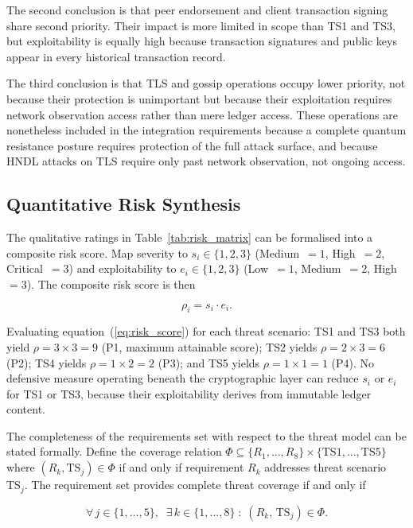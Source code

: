 \documentclass[conference]{IEEEtran}
\begin{document}
The second conclusion is that peer endorsement and client transaction
signing share second priority. Their impact is more limited in scope than
TS1 and TS3, but exploitability is equally high because transaction
signatures and public keys appear in every historical transaction record.

The third conclusion is that TLS and gossip operations occupy lower
priority, not because their protection is unimportant but because their
exploitation requires network observation access rather than mere ledger
access. These operations are nonetheless included in the integration
requirements because a complete quantum resistance posture requires
protection of the full attack surface, and because HNDL attacks on TLS
require only past network observation, not ongoing access.

\subsection{Quantitative Risk Synthesis}
\label{sec:tm_risk_quant}

The qualitative ratings in Table~\ref{tab:risk_matrix} can be
formalised into a composite risk score. Map severity to
$s_i \in \{1, 2, 3\}$ (Medium~$= 1$, High~$= 2$, Critical~$= 3$)
and exploitability to $e_i \in \{1, 2, 3\}$ (Low~$= 1$,
Medium~$= 2$, High~$= 3$). The composite risk score is then

\begin{equation}
\rho_i = s_i \cdot e_i.
\label{eq:risk_score}
\end{equation}

Evaluating equation~(\ref{eq:risk_score}) for each threat scenario:
TS1 and TS3 both yield $\rho = 3 \times 3 = 9$ (P1, maximum
attainable score); TS2 yields $\rho = 2 \times 3 = 6$ (P2);
TS4 yields $\rho = 1 \times 2 = 2$ (P3); and TS5 yields
$\rho = 1 \times 1 = 1$ (P4). No defensive measure operating
beneath the cryptographic layer can reduce $s_i$ or $e_i$
for TS1 or TS3, because their exploitability derives from
immutable ledger content.

The completeness of the requirements set with respect to the threat
model can be stated formally. Define the coverage relation
$\Phi \subseteq \{R_1,\ldots,R_8\} \times \{\mathrm{TS1},\ldots,\mathrm{TS5}\}$
where $(R_k, \mathrm{TS}_j) \in \Phi$ if and only if requirement $R_k$
addresses threat scenario $\mathrm{TS}_j$. The requirement set provides
complete threat coverage if and only if

\begin{equation}
\forall\, j \in \{1,\ldots,5\},\;\;
\exists\, k \in \{1,\ldots,8\} \;:\; (R_k,\,\mathrm{TS}_j) \in \Phi.
\label{eq:req_coverage}
\end{equation}
\end{document}
